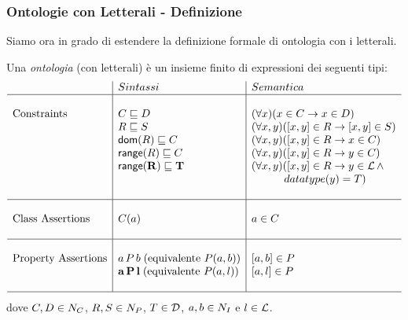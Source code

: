 \documentclass[8pt]{beamer}
\begin{document}
\begin{frame}
\frametitle{Ontologie con Letterali - Definizione}
Siamo ora in grado di estendere la definizione formale di ontologia 
con i letterali.

Una \emph{ontologia} (con letterali) \`e un insieme finito di expressioni dei seguenti tipi:
\[
 \begin{array}{l|l|l}
  & Sintassi & Semantica \\
  \hline
  &&\\
  \mbox{Constraints} & C \sqsubseteq D & (\forall x)(x \in C \rightarrow x \in D) \\
  & R \sqsubseteq S & (\forall x, y)([x, y] \in R \rightarrow [x,y] \in S) \\
  & \mathsf{dom}(R) \sqsubseteq C & (\forall x, y)([x, y] \in R \rightarrow x \in C) \\
  & \mathsf{range}(R) \sqsubseteq C & (\forall x, y)([x, y] \in R \rightarrow y \in C) \\
  & \mathbf{\mathsf{range}(R) \sqsubseteq T} & (\forall x, y)([x, y] \in R \rightarrow y \in \mathcal{L} \, \wedge \\
  && \quad\quad\quad datatype(y)=T) \\
  &&\\
  \hline
  &&\\
  \mbox{Class Assertions} & C(a) & a \in C\\
  &&\\
  \hline
  &&\\
  \mbox{Property Assertions} & a\,P\,b\;(\mbox{equivalente }P(a,b)) & [a,b] \in P \\
  & \mathbf{a\,P\,l}\;(\mbox{equivalente }P(a,l)) & [a,l] \in P \\
  &&\\
  \hline  
 \end{array}
\]
dove $C, D \in N_C$, $R, S \in N_P$, $T \in \mathcal{D}$, $a, b \in N_I$ e $l \in \mathcal{L}$.
\end{frame}
\end{document}
